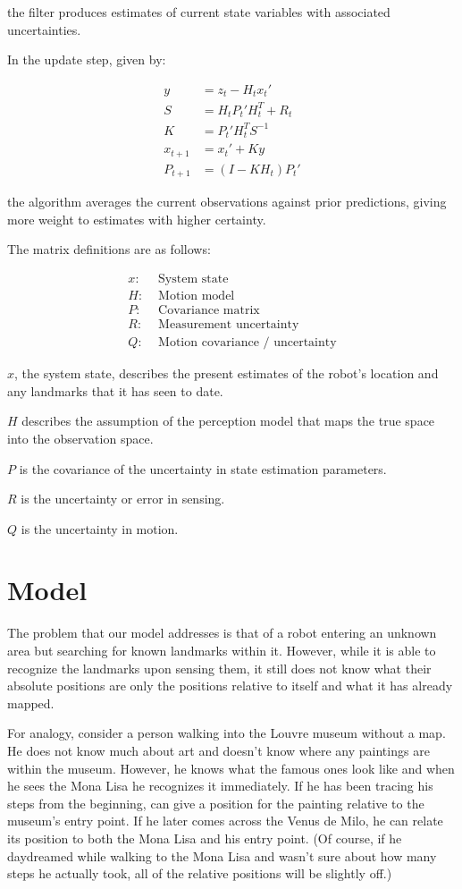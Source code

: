 \documentclass[prodmode,acmtecs]{acmsmall} %
\begin{document}
the filter produces estimates of current state variables with associated uncertainties.

In the update step, given by:

\begin{align*}
    y &= z_t - H_t x_t' \\
    S &= H_t P_t' H^T_t + R_t \\
    K &= P_t' H^T_t S^{-1} \\
    x_{t+1} &= x_t' + Ky \\
    P_{t+1} &= (I - K H_t) P_t'
\end{align*}

the algorithm averages the current observations against prior predictions, giving more weight to estimates with higher certainty.

The matrix definitions are as follows:

\begin{align*}
    x:& \text{ System state}\\
    H:& \text{ Motion model}\\
    P:& \text{ Covariance matrix}\\
    R:& \text{ Measurement uncertainty}\\
    Q:& \text{ Motion covariance / uncertainty}
\end{align*}

$x$, the system state, describes the present estimates of the robot's location and any landmarks that it has seen to date.

$H$ describes the assumption of the perception model that maps the true space into the observation space.

$P$ is the covariance of the uncertainty in state estimation parameters.

$R$ is the uncertainty or error in sensing.

$Q$ is the uncertainty in motion.


\section{Model}

The problem that our model addresses is that of a robot entering an unknown area but searching for known landmarks within it.  However, while it is able to recognize the landmarks upon sensing them, it still does not know what their absolute positions are \- only the positions relative to itself and what it has already mapped.

For analogy, consider a person walking into the Louvre museum without a map.  He does not know much about art and doesn't know where any paintings are within the museum.  However, he knows what the famous ones look like and when he sees the Mona Lisa he recognizes it immediately. If he has been tracing his steps from the beginning, can give a position for the painting relative to the museum's entry point.  If he later comes across the Venus de Milo, he can relate its position to both the Mona Lisa and his entry point.  (Of course, if he daydreamed while walking to the Mona Lisa and wasn't sure about how many steps he actually took, all of the relative positions will be slightly off.)
\end{document}
